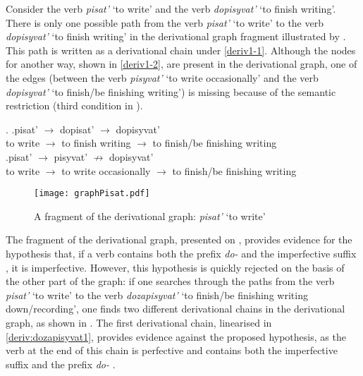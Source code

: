 Consider the verb \textit{pisat'} `to write' and the verb \textit{dopisyvat'} `to finish writing'. There is only one possible path from the verb \textit{pisat'} `to write' to the verb \textit{dopisyvat'} `to finish writing' in the derivational graph fragment illustrated by . This path is written as a derivational chain under \ref{deriv1-1}. Although the nodes for another way, shown in \ref{deriv1-2}, are present in the derivational graph, one of the edges (between the verb \textit{pisyvat'} `to write occasionally' and the verb \textit{dopisyvat'} `to finish/be finishing writing') is missing because of the semantic restriction (third condition in ).

\ex.\label{deriv1} \ag.\label{deriv1-1}pisat'\textsuperscript{\IPF} $\rightarrow$ dopisat'\textsuperscript{\PF} $\rightarrow$ dopisyvat'\textsuperscript{\IPF}\\
{to write} $\rightarrow$ {to finish writing} $\rightarrow$ {to finish/be finishing writing}\\
\bg.\label{deriv1-2}pisat'\textsuperscript{\IPF} $\rightarrow$ pisyvat'\textsuperscript{\IPF} $\nrightarrow$ dopisyvat'\\
{to write} $\rightarrow$ {to write occasionally} $\rightarrow$ {to finish/be finishing writing}\\

\begin{figure}
\texttt{[image: graphPisat.pdf]}
\caption{A fragment of the derivational graph: \textit{pisat'} `to write'\label{tree:dopisyvat}}
\end{figure}

The fragment of the derivational graph, presented on , provides evidence for the hypothesis that, if a verb contains both the prefix \textit{do-}   and the imperfective suffix  , it is imperfective. However, this hypothesis is quickly rejected on the basis of the other part of the graph: if one searches through the paths from the verb \textit{pisat'} `to write' to the verb \textit{dozapisyvat'} `to finish/be finishing writing down/recording', one finds two different derivational chains in the derivational graph, as shown in . The first derivational chain, linearised in \ref{deriv:dozapisyvat1}, provides evidence against the proposed hypothesis, as the verb at the end of this chain is perfective and contains both the imperfective suffix   and the prefix \textit{do-}  . 

